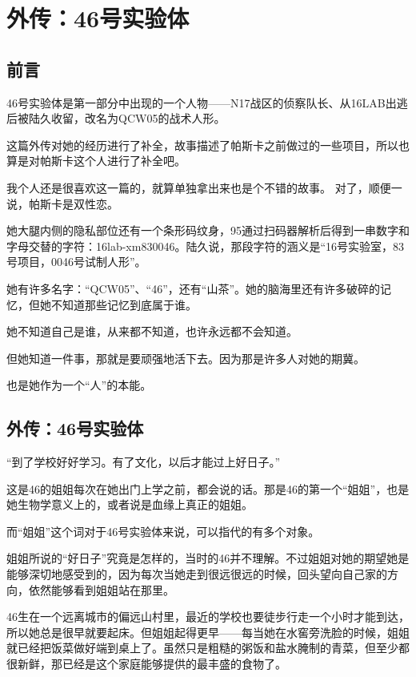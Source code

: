 \specialsectioning
\chapter{外传：46号实验体}
\section*{前言}

46号实验体是第一部分中出现的一个人物——N17战区的侦察队长、从16LAB出逃后被陆久收留，改名为QCW05的战术人形。

这篇外传对她的经历进行了补全，故事描述了帕斯卡之前做过的一些项目，所以也算是对帕斯卡这个人进行了补全吧。

我个人还是很喜欢这一篇的，就算单独拿出来也是个不错的故事。
对了，顺便一说，帕斯卡是双性恋。

\lineseparator








她大腿内侧的隐私部位还有一个条形码纹身，95通过扫码器解析后得到一串数字和字母交替的字符：16lab-xm830046。陆久说，那段字符的涵义是“16号实验室，83号项目，0046号试制人形”。

她有许多名字：“QCW05”、“46”，还有“山茶”。她的脑海里还有许多破碎的记忆，但她不知道那些记忆到底属于谁。

她不知道自己是谁，从来都不知道，也许永远都不会知道。

但她知道一件事，那就是要顽强地活下去。因为那是许多人对她的期冀。

也是她作为一个“人”的本能。

\section*{外传：46号实验体}

“到了学校好好学习。有了文化，以后才能过上好日子。”

这是46的姐姐每次在她出门上学之前，都会说的话。那是46的第一个“姐姐”，也是她生物学意义上的，或者说是血缘上真正的姐姐。

而“姐姐”这个词对于46号实验体来说，可以指代的有多个对象。

姐姐所说的“好日子”究竟是怎样的，当时的46并不理解。不过姐姐对她的期望她是能够深切地感受到的，因为每次当她走到很远很远的时候，回头望向自己家的方向，依然能够看到姐姐站在那里。

46生在一个远离城市的偏远山村里，最近的学校也要徒步行走一个小时才能到达，所以她总是很早就要起床。但姐姐起得更早——每当她在水窖旁洗脸的时候，姐姐就已经把饭菜做好端到桌上了。虽然只是粗糙的粥饭和盐水腌制的青菜，但至少都很新鲜，那已经是这个家庭能够提供的最丰盛的食物了。

